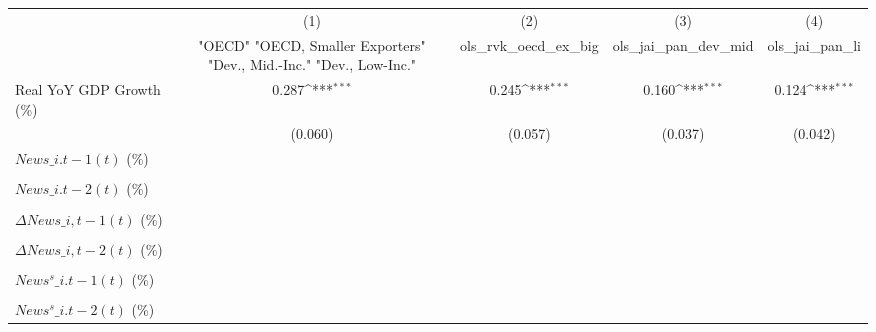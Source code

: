 {
\def\sym#1{\ifmmode^{#1}\else\(^{#1}\)\fi}
\begin{tabular}{l*{4}{c}}
\toprule
                    &\multicolumn{1}{c}{(1)}&\multicolumn{1}{c}{(2)}&\multicolumn{1}{c}{(3)}&\multicolumn{1}{c}{(4)}\\
                    &\multicolumn{1}{c}{ "OECD" "OECD, Smaller Exporters" "Dev., Mid.-Inc." "Dev., Low-Inc."}&\multicolumn{1}{c}{ols\_rvk\_oecd\_ex\_big}&\multicolumn{1}{c}{ols\_jai\_pan\_dev\_mid}&\multicolumn{1}{c}{ols\_jai\_pan\_li}\\
\midrule
Real YoY GDP Growth (\%)&       0.287\sym{***}&       0.245\sym{***}&       0.160\sym{***}&       0.124\sym{***}\\
                    &     (0.060)         &     (0.057)         &     (0.037)         &     (0.042)         \\
\addlinespace
$ News\_{i.t-1}(t)$ (\%)&                     &                     &                     &                     \\
                    &                     &                     &                     &                     \\
\addlinespace
$ News\_{i.t-2}(t)$ (\%)&                     &                     &                     &                     \\
                    &                     &                     &                     &                     \\
\addlinespace
$ \Delta News\_{i,t-1}(t)$ (\%)&                     &                     &                     &                     \\
                    &                     &                     &                     &                     \\
\addlinespace
$ \Delta News\_{i,t-2}(t)$ (\%)&                     &                     &                     &                     \\
                    &                     &                     &                     &                     \\
\addlinespace
$ News^s\_{i.t-1}(t)$ (\%)&                     &                     &                     &                     \\
                    &                     &                     &                     &                     \\
\addlinespace
$ News^s\_{i.t-2}(t)$ (\%)&                     &                     &                     &                     \\

\end{tabular}}
